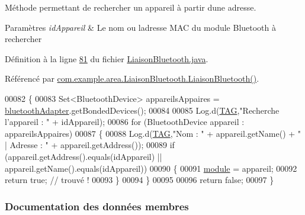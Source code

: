 Méthode permettant de rechercher un appareil à partir d\textquotesingle{}une adresse. 


\begin{DoxyParams}{Paramètres}
{\em id\+Appareil} & Le nom ou l\textquotesingle{}adresse M\+AC du module Bluetooth à rechercher \\
\hline
\end{DoxyParams}


Définition à la ligne \hyperlink{_liaison_bluetooth_8java_source_l00081}{81} du fichier \hyperlink{_liaison_bluetooth_8java_source}{Liaison\+Bluetooth.\+java}.



Référencé par \hyperlink{_liaison_bluetooth_8java_source_l00048}{com.\+example.\+area.\+Liaison\+Bluetooth.\+Liaison\+Bluetooth()}.


\begin{DoxyCode}
00082     \{
00083         Set<BluetoothDevice> appareilsAppaires = \hyperlink{classcom_1_1example_1_1area_1_1_liaison_bluetooth_a7462ce946676c47ee83289c7bb436b64}{bluetoothAdapter}.getBondedDevices();
00084 
00085         Log.d(\hyperlink{classcom_1_1example_1_1area_1_1_liaison_bluetooth_ac51aa4b63fae5c36734a061cc05d7fc9}{TAG},\textcolor{stringliteral}{"Recherche l'appareil : "} + idAppareil);
00086         \textcolor{keywordflow}{for} (BluetoothDevice appareil : appareilsAppaires)
00087         \{
00088             Log.d(\hyperlink{classcom_1_1example_1_1area_1_1_liaison_bluetooth_ac51aa4b63fae5c36734a061cc05d7fc9}{TAG},\textcolor{stringliteral}{"Nom : "} + appareil.getName() + \textcolor{stringliteral}{" | Adresse : "} + appareil.getAddress());
00089             \textcolor{keywordflow}{if} (appareil.getAddress().equals(idAppareil) || appareil.getName().equals(idAppareil))
00090             \{
00091                 \hyperlink{classcom_1_1example_1_1area_1_1_liaison_bluetooth_a80068a7178f6c84eae7bab50cf0a784a}{module} = appareil;
00092                 \textcolor{keywordflow}{return} \textcolor{keyword}{true}; \textcolor{comment}{// trouvé !}
00093             \}
00094         \}
00095 
00096         \textcolor{keywordflow}{return} \textcolor{keyword}{false};
00097     \}
\end{DoxyCode}


\subsubsection{Documentation des données membres}
\mbox{\label{classcom_1_1example_1_1area_1_1_liaison_bluetooth_a7462ce946676c47ee83289c7bb436b64}} 
